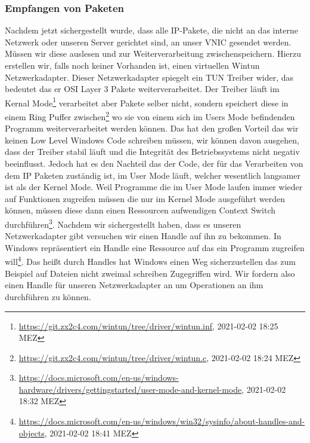 \subsubsection{Empfangen von Paketen}
Nachdem jetzt sichergestellt wurde, dass alle IP-Pakete, die nicht an das interne Netzwerk oder unseren Server gerichtet sind, an unser VNIC gesendet werden. Müssen wir diese auslesen und zur Weiterverarbeitung zwischenspeichern.
\newline
\newline
Hierzu erstellen wir, falls noch keiner Vorhanden ist, einen virtuellen Wintun Netzwerkadapter. Dieser Netzwerkadapter spiegelt ein TUN Treiber wider, das bedeutet das er OSI Layer 3 Pakete weiterverarbeitet. Der Treiber läuft im Kernal Mode\footnote{\url{https://git.zx2c4.com/wintun/tree/driver/wintun.inf}, 2021-02-02 18:25 MEZ} verarbeitet aber Pakete selber nicht, sondern speichert diese in einem Ring Puffer zwischen\footnote{\url{https://git.zx2c4.com/wintun/tree/driver/wintun.c}, 2021-02-02 18:24 MEZ} wo sie von einem sich im Users Mode befindenden Programm weiterverarbeitet werden können. Das hat den großen Vorteil das wir keinen Low Level Windows Code schreiben müssen, wir können davon ausgehen, dass der Treiber stabil läuft und die Integrität des Betriebssystems nicht negativ beeinflusst. Jedoch hat es den Nachteil das der Code, der für das Verarbeiten von dem IP Paketen zuständig ist, im User Mode läuft, welcher wesentlich langsamer ist als der Kernel Mode. Weil Programme die im User Mode laufen immer wieder auf Funktionen zugreifen müssen die nur im Kernel Mode ausgeführt werden können, müssen diese dann einen Ressourcen aufwendigen Context Switch durchführen\footnote{\url{https://docs.microsoft.com/en-us/windows-hardware/drivers/gettingstarted/user-mode-and-kernel-mode}, 2021-02-02 18:32 MEZ}.
\newline
\newline
Nachdem wir sichergestellt haben, dass es unseren Netzwerkadapter gibt versuchen wir einen Handle auf ihn zu bekommen. In Windows repräsentiert ein Handle eine Ressource auf das ein Programm zugreifen will\footnote{\url{https://docs.microsoft.com/en-us/windows/win32/sysinfo/about-handles-and-objects}, 2021-02-02 18:41 MEZ}. Das heißt durch Handles hat Windows einen Weg sicherzustellen das zum Beispiel auf Dateien nicht zweimal schreiben Zugegriffen wird. Wir fordern also einen Handle für unseren Netzwerkadapter an um Operationen an ihm durchführen zu können.
\newline
\newline
